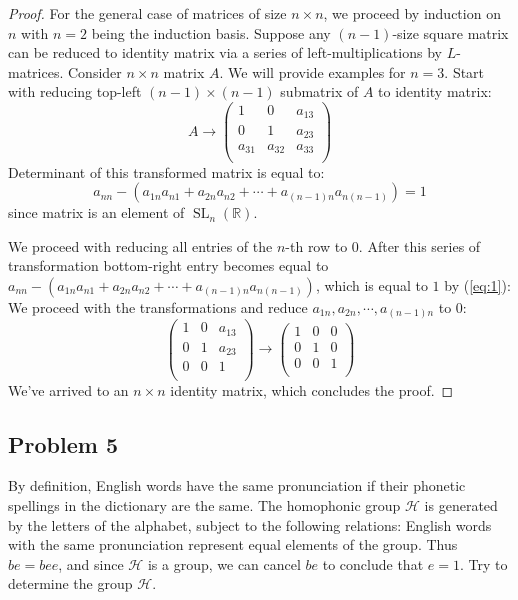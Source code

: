 \documentclass{article}
\newcommand{\R}{\mathbb{R}}
\newcommand{\SL}{\operatorname{SL}}
\newcommand{\SLnR}{\SL_n(\R)}
\begin{document}
\begin{proof}
For the general case of matrices of size $n \times n$, we proceed by induction on $n$ with $n=2$ being the induction basis.
Suppose any $(n-1)$-size square matrix can be reduced to identity matrix via a series of left-multiplications by $L$-matrices.
Consider $n \times n$ matrix $A$.
We will provide examples for $n=3$.
Start with reducing top-left $(n-1) \times (n-1)$ submatrix of $A$ to identity matrix:
\[ A \to
    \begin{pmatrix}
        1 & 0 & a_{13} \\
        0 & 1 & a_{23} \\
        a_{31} & a_{32} & a_{33} \\
    \end{pmatrix}
\]
Determinant of this transformed matrix is equal to:
\begin{equation} \label{eq:1}
    a_{nn} - \left( a_{1n}a_{n1} + a_{2n}a_{n2} + \cdots + a_{(n-1)n}a_{n(n-1)} \right) = 1    
\end{equation}
since matrix is an element of $\SLnR$.

We proceed with reducing all entries of the $n$-th row to $0$.
After this series of transformation bottom-right entry becomes equal to $a_{nn} - ( a_{1n}a_{n1} + a_{2n}a_{n2} + \cdots + a_{(n-1)n}a_{n(n-1)})$, which is equal to $1$ by (\ref{eq:1}):
We proceed with the transformations and reduce $a_{1n}, a_{2n}, \cdots, a_{(n-1)n}$ to $0$:
\[
    \begin{pmatrix}
        1 & 0 & a_{13} \\
        0 & 1 & a_{23} \\
        0 & 0 & 1 \\
    \end{pmatrix}
    \to
    \begin{pmatrix}
        1 & 0 & 0 \\
        0 & 1 & 0 \\
        0 & 0 & 1 \\
    \end{pmatrix}
\]
We've arrived to an $n \times n$ identity matrix, which concludes the proof.

\end{proof}


\subsection*{Problem 5}

\begin{tcolorbox}
By definition, English words have the same pronunciation if their phonetic spellings in the dictionary are the same.
The homophonic group $\mathcal{H}$ is generated by the letters of the alphabet, subject to the following relations: English words with the same pronunciation represent equal elements of the group.
Thus $be = bee$, and since $\mathcal{H}$ is a group, we can cancel $be$ to conclude that $e=1$. Try to determine the group $\mathcal{H}$.
\end{tcolorbox}
\end{document}

